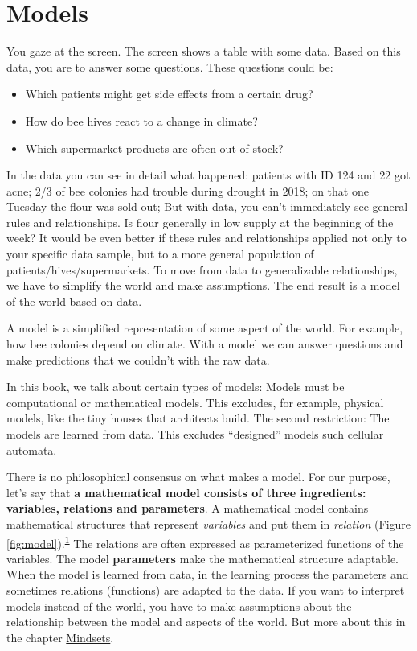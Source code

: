 \documentclass[
  10pt,
]{scrbook}
\providecommand{\tightlist}{%
  \setlength{\itemsep}{0pt}\setlength{\parskip}{0pt}}
\begin{document}
\mainmatter

\hypertarget{models}{%
\chapter{Models}\label{models}}

You gaze at the screen.
The screen shows a table with some data.
Based on this data, you are to answer some questions.
These questions could be:

\begin{itemize}
\tightlist
\item
  Which patients might get side effects from a certain drug?
\item
  How do bee hives react to a change in climate?
\item
  Which supermarket products are often out-of-stock?
\end{itemize}

In the data you can see in detail what happened: patients with ID 124 and 22 got acne; 2/3 of bee colonies had trouble during drought in 2018; on that one Tuesday the flour was sold out;
But with data, you can't immediately see general rules and relationships.
Is flour generally in low supply at the beginning of the week?
It would be even better if these rules and relationships applied not only to your specific data sample, but to a more general population of patients/hives/supermarkets.
To move from data to generalizable relationships, we have to simplify the world and make assumptions.
The end result is a model of the world based on data.

A model is a simplified representation of some aspect of the world.
For example, how bee colonies depend on climate.
With a model we can answer questions and make predictions that we couldn't with the raw data.

In this book, we talk about certain types of models:
Models must be computational or mathematical models.
This excludes, for example, physical models, like the tiny houses that architects build.
The second restriction: The models are learned from data.
This excludes ``designed'' models such cellular automata.

There is no philosophical consensus on what makes a model.
For our purpose, let's say that \textbf{a mathematical model consists of three ingredients: variables, relations and parameters}.
A mathematical model contains mathematical structures that represent \emph{variables} and put them in \emph{relation} (Figure \ref{fig:model}).\textsuperscript{\protect\hyperlink{ref-weisberg2012simulation}{1}}
The relations are often expressed as parameterized functions of the variables.
The model \textbf{parameters} make the mathematical structure adaptable.
When the model is learned from data, in the learning process the parameters and sometimes relations (functions) are adapted to the data.
If you want to interpret models instead of the world, you have to make assumptions about the relationship between the model and aspects of the world.
But more about this in the chapter \protect\hyperlink{mindsets}{Mindsets}.
\end{document}
